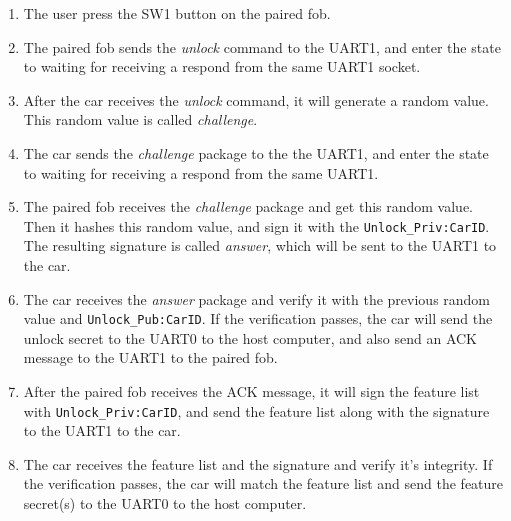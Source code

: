 \documentclass[11pt,oneside,onecolumn,letterpaper]{article}
\begin{document}
\begin{enumerate}
	\item The user press the SW1 button on the paired fob.
	\item The paired fob sends the \textit{unlock} command to the UART1, and enter the state to waiting for receiving a respond from the same UART1 socket.
	\item After the car receives the \textit{unlock} command, it will generate a random value. This random value is called \textit{challenge}.
	\item The car sends the \textit{challenge} package to the the UART1, and enter the state to waiting for receiving a respond from the same UART1.
	\item The paired fob receives the \textit{challenge} package and get this random value. Then it hashes this random value, and sign it with the \verb|Unlock_Priv:CarID|. The resulting signature is called \textit{answer}, which will be sent to the UART1 to the car.
	\item The car receives the \textit{answer} package and verify it with the previous random value and \verb|Unlock_Pub:CarID|. If the verification passes, the car will send the unlock secret to the UART0 to the host computer, and also send an ACK message to the UART1 to the paired fob.
	\item After the paired fob receives the ACK message, it will sign the feature list with  \verb|Unlock_Priv:CarID|, and send the feature list along with the signature to the UART1 to the car.
	\item The car receives the feature list and the signature and verify it's integrity. If the verification passes, the car will match the feature list and send the feature secret(s) to the UART0 to the host computer.
\end{enumerate}
\end{document}
